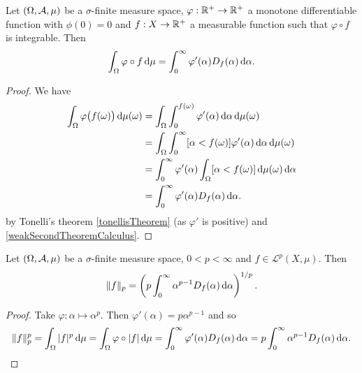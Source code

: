 \begin{proposition}
Let $\sSet{\Omega, \mathcal{A}, \mu}$ be a $\sigma$-finite measure space, $\varphi: \mathbb{R}^+\to \mathbb{R}^+$ a monotone differentiable function with $\phi(0) = 0$ and $f: X\to \mathbb{R}^+$ a measurable function such that $\varphi\circ f$ is integrable. Then
\[ \int_\Omega\varphi\circ f \operatorname{d \!}{\mu} = \int_0^\infty \varphi'(\alpha)D_f(\alpha)\operatorname{d \!}{\alpha}. \]
\end{proposition}
\begin{proof}
We have
\begin{align*}
\int_\Omega\varphi\big(f(\omega)\big) \diff{\mu(\omega)} &= \int_\Omega\int_{0}^{f(\omega)}\varphi'(\alpha)\diff{\alpha} \diff{\mu(\omega)} \\
&= \int_\Omega\int_{0}^{\infty}[\alpha < f(\omega)]\varphi'(\alpha)\diff{\alpha} \diff{\mu(\omega)} \\
&= \int_{0}^{\infty}\varphi'(\alpha)\int_\Omega[\alpha < f(\omega)]\diff{\mu(\omega)}\diff{\alpha} \\
&= \int_{0}^{\infty}\varphi'(\alpha)D_f(\alpha)\diff{\alpha}.
\end{align*}
by Tonelli's theorem \ref{tonellisTheorem} (as $\varphi'$ is positive) and \ref{weakSecondTheoremCalculus}.
\end{proof}
\begin{corollary} \label{LpNormFromDistribution}
Let $\sSet{\Omega, \mathcal{A}, \mu}$ be a $\sigma$-finite measure space, $0<p<\infty$ and $f\in \mathcal{L}^p(X,\mu)$. Then
\[ \lVert f\rVert_p = \left(p\int_0^\infty \alpha^{p-1}D_f(\alpha)\operatorname{d \!}{\alpha}\right)^{1/p}. \]
\end{corollary}
\begin{proof}
Take $\varphi: \alpha\mapsto \alpha^p$. Then $\varphi'(\alpha) = p\alpha^{p-1}$ and so
\[ \lVert f\rVert_p^p = \int_\Omega |f|^p \operatorname{d \!}{\mu} = \int_\Omega \varphi\circ|f| \operatorname{d \!}{\mu} = \int_0^\infty \varphi'(\alpha)D_f(\alpha)\operatorname{d \!}{\alpha} = p\int_0^\infty \alpha^{p-1}D_f(\alpha)\operatorname{d \!}{\alpha}. \]
\end{proof}

